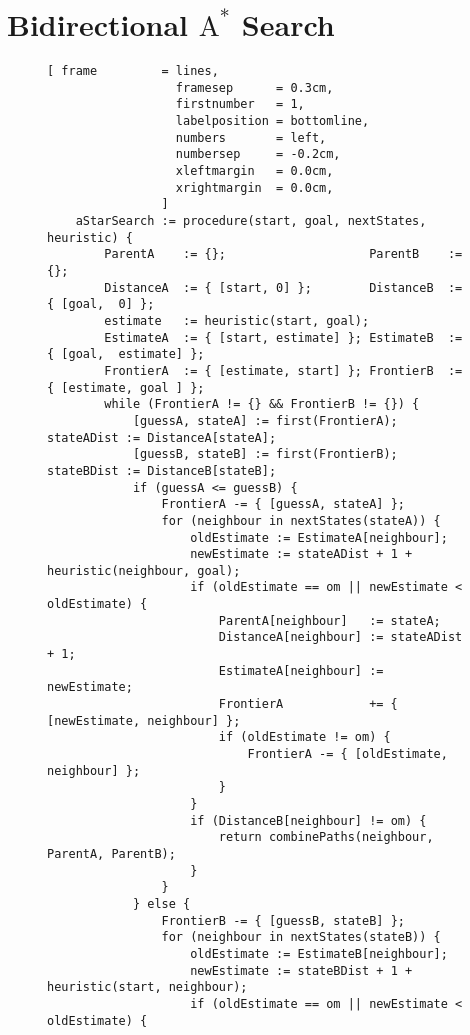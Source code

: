 \section{Bidirectional $\mathrm{A}^*$ Search}
\begin{figure}[!ht]
\centering
\begin{Verbatim}[ frame         = lines,
                  framesep      = 0.3cm,
                  firstnumber   = 1,
                  labelposition = bottomline,
                  numbers       = left,
                  numbersep     = -0.2cm,
                  xleftmargin   = 0.0cm,
                  xrightmargin  = 0.0cm,
                ]
    aStarSearch := procedure(start, goal, nextStates, heuristic) {
        ParentA    := {};                    ParentB    := {};                    
        DistanceA  := { [start, 0] };        DistanceB  := { [goal,  0] };
        estimate   := heuristic(start, goal);
        EstimateA  := { [start, estimate] }; EstimateB  := { [goal,  estimate] };  
        FrontierA  := { [estimate, start] }; FrontierB  := { [estimate, goal ] };  
        while (FrontierA != {} && FrontierB != {}) {
            [guessA, stateA] := first(FrontierA); stateADist := DistanceA[stateA];
            [guessB, stateB] := first(FrontierB); stateBDist := DistanceB[stateB];
            if (guessA <= guessB) {
                FrontierA -= { [guessA, stateA] };
                for (neighbour in nextStates(stateA)) {
                    oldEstimate := EstimateA[neighbour];
                    newEstimate := stateADist + 1 + heuristic(neighbour, goal);
                    if (oldEstimate == om || newEstimate < oldEstimate) {
                        ParentA[neighbour]   := stateA;
                        DistanceA[neighbour] := stateADist + 1;
                        EstimateA[neighbour] := newEstimate;
                        FrontierA            += { [newEstimate, neighbour] };
                        if (oldEstimate != om) { 
                            FrontierA -= { [oldEstimate, neighbour] }; 
                        }
                    }
                    if (DistanceB[neighbour] != om) {
                        return combinePaths(neighbour, ParentA, ParentB);
                    }
                }
            } else {
                FrontierB -= { [guessB, stateB] };
                for (neighbour in nextStates(stateB)) {
                    oldEstimate := EstimateB[neighbour];
                    newEstimate := stateBDist + 1 + heuristic(start, neighbour);
                    if (oldEstimate == om || newEstimate < oldEstimate) {

\end{Verbatim}
\end{figure}
